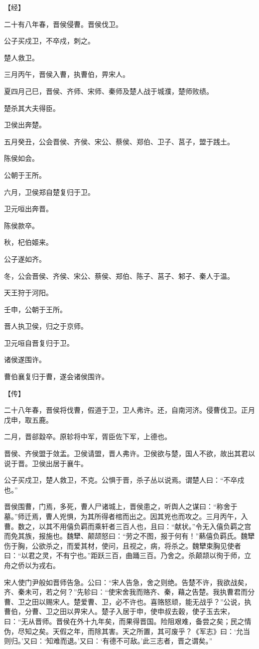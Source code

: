 \documentclass[a4paper,12pt,UTF8,twoside]{ctexbook}
\begin{document}
【经】

二十有八年春，晋侯侵曹。晋侯伐卫。

公子买戍卫，不卒戍，刺之。

楚人救卫。

三月丙午，晋侯入曹，执曹伯，畀宋人。

夏四月己巳，晋侯、齐师、宋师、秦师及楚人战于城濮，楚师败绩。

楚杀其大夫得臣。

卫侯出奔楚。

五月癸丑，公会晋侯、齐侯、宋公、蔡侯、郑伯、卫子、莒子，盟于践土。

陈侯如会。

公朝于王所。

六月，卫侯郑自楚复归于卫。

卫元咺出奔晋。

陈侯款卒。

秋，杞伯姬来。

公子遂如齐。

冬，公会晋侯、齐侯、宋公、蔡侯、郑伯、陈子、莒子、邾子、秦人于温。

天王狩于河阳。

壬申，公朝于王所。

晋人执卫侯，归之于京师。

卫元咺自晋复归于卫。

诸侯遂围许。

曹伯襄复归于曹，遂会诸侯围许。

【传】

二十八年春，晋侯将伐曹，假道于卫，卫人弗许。还，自南河济。侵曹伐卫。正月戊申，取五鹿。

二月，晋郤縠卒。原轸将中军，胥臣佐下军，上德也。

晋侯、齐侯盟于敛盂。卫侯请盟，晋人弗许。卫侯欲与楚，国人不欲，故出其君以说于晋。卫侯出居于襄牛。

公子买戍卫，楚人救卫，不克。公惧于晋，杀子丛以说焉。谓楚人曰：“不卒戍也。”

晋侯围曹，门焉，多死，曹人尸诸城上，晋侯患之，听舆人之谋曰：“称舍于墓。”师迁焉，曹人兇惧，为其所得者棺而出之。因其兇也而攻之。三月丙午，入曹。数之，以其不用僖负羁而乘轩者三百人也，且曰：“献状。”令无入僖负羁之宫而免其族，报施也。魏犫、颠颉怒曰：“劳之不图，报于何有！”爇僖负羁氏。魏犫伤于胸，公欲杀之，而爱其材，使问，且视之，病，将杀之。魏犫束胸见使者曰：“以君之灵，不有宁也。”距跃三百，曲踊三百。乃舍之。杀颠颉以徇于师，立舟之侨以为戎右。

宋人使门尹般如晋师告急。公曰：“宋人告急，舍之则绝。告楚不许，我欲战矣，齐、秦未可，若之何？”先轸曰：“使宋舍我而赂齐、秦，藉之告楚。我执曹君而分曹、卫之田以赐宋人。楚爱曹、卫，必不许也。喜赂怒顽，能无战乎？”公说，执曹伯，分曹、卫之田以畀宋人。楚子入居于申，使申叔去穀，使子玉去宋，曰：“无从晋师。晋侯在外十九年矣，而果得晋国。险阻艰难，备尝之矣；民之情伪，尽知之矣。天假之年，而除其害。天之所置，其可废乎？《军志》曰：‘允当则归。’又曰：‘知难而退。’又曰：‘有德不可敌。’此三志者，晋之谓矣。”
\end{document}
